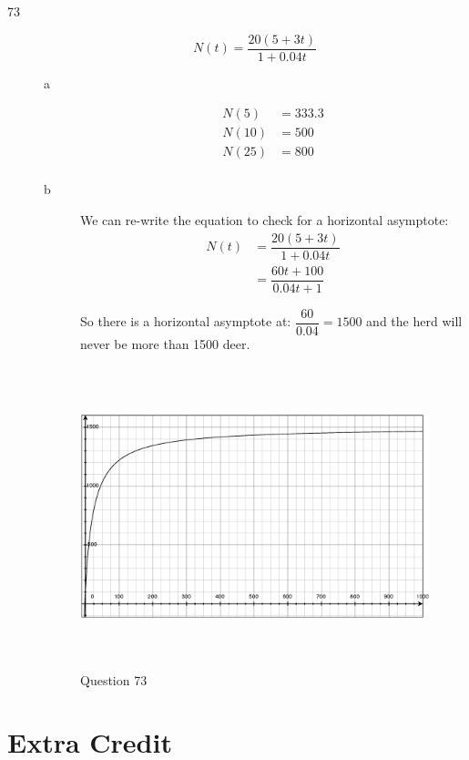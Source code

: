 \documentclass[fleqn,addpoints]{exam}
\begin{document}
\begin{description}
\pagebreak

\item[73]
\[
  N(t) = \dfrac{20(5+3t)}{1 + 0.04t}
\]

\begin{description}

\item[a] 
\begin{align*}
 N(5)  &= 333.3 \\
 N(10) &= 500 \\
 N(25) &= 800 \\
\end{align*}

\item[b]
We can re-write the equation to check for a horizontal asymptote:
\begin{align*}
  N(t) &= \dfrac{20(5+3t)}{1 + 0.04t} \\
       &= \dfrac{60t + 100}{0.04t + 1}
\end{align*}

So there is a horizontal asymptote at: $\dfrac{60}{0.04} = 1500$ and the herd will never be more than 1500 deer.

\end{description}

\begin{figure}[H]
  \centering
  \includegraphics[width=12.25cm,height=8.75cm]{question73.eps}
  \caption*{Question 73}
\end{figure}

\end{description}

\fi

\pagebreak

\section{Extra Credit}
\end{document}
